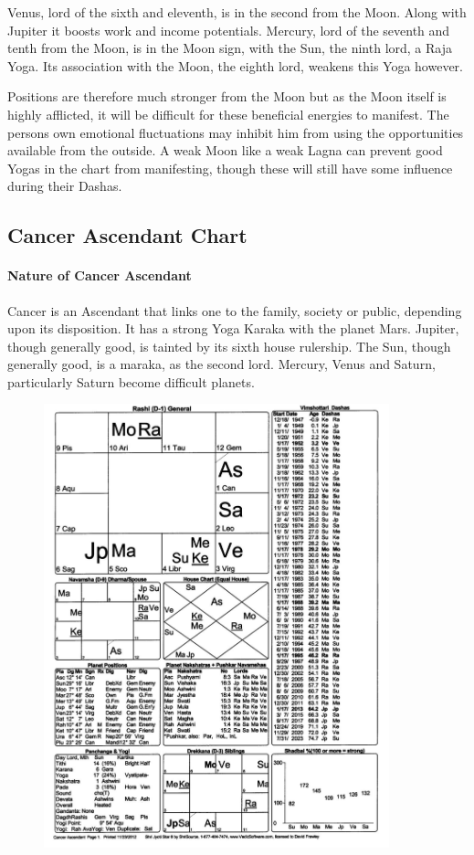  

Venus, lord of the sixth and eleventh, is in the second from the Moon. Along with Jupiter it boosts work and income potentials. Mercury, lord of the seventh and tenth from the Moon, is in the Moon sign, with the Sun, the ninth lord, a Raja Yoga. Its association with the Moon, the eighth lord, weakens this Yoga however.

 

Positions are therefore much stronger from the Moon but as the Moon itself is highly afflicted, it will be difficult for these beneficial energies to manifest. The persons own emotional fluctuations may inhibit him from using the opportunities available from the outside. A weak Moon like a weak Lagna can prevent good Yogas in the chart from manifesting, though these will still have some influence during their Dashas.

 

\subsection{Cancer Ascendant Chart}
 

\paragraph{Nature of Cancer Ascendant}

 

Cancer is an Ascendant that links one to the family, society or public, depending upon its disposition. It has a strong Yoga Karaka with the planet Mars. Jupiter, though generally good, is tainted by its sixth house rulership. The Sun, though generally good, is a maraka, as the second lord. Mercury, Venus and Saturn, particularly Saturn become difficult planets.


\begin{figure}[h]
\centering
\includegraphics[width=10cm]{pics/Cancer-Ascendant.jpg}
\caption{}
\end{figure}
 

